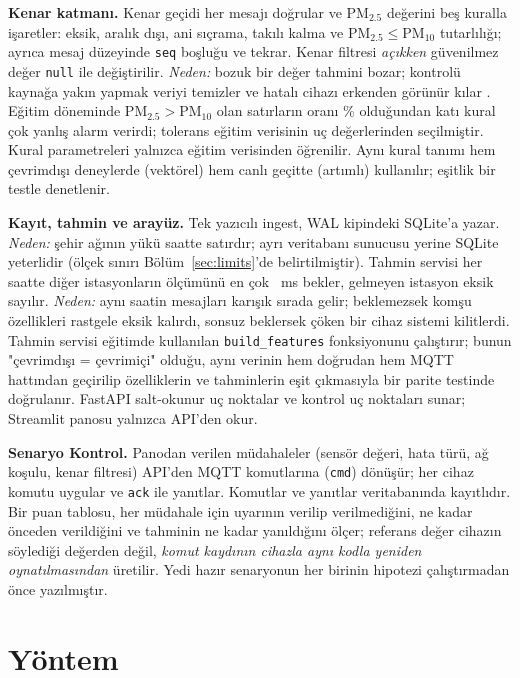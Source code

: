 \documentclass[conference]{IEEEtran}
\newcommand{\pmtwo}{PM$_{2.5}$}
\begin{document}
\textbf{Kenar katmanı.} Kenar geçidi her mesajı doğrular ve \pmtwo{} değerini beş kuralla işaretler: eksik, aralık dışı, ani sıçrama, takılı kalma ve \pmtwo{}$\le$PM$_{10}$ tutarlılığı; ayrıca mesaj düzeyinde \texttt{seq} boşluğu ve tekrar. Kenar filtresi \emph{açıkken} güvenilmez değer \texttt{null} ile değiştirilir. \emph{Neden:} bozuk bir değer tahmini bozar; kontrolü kaynağa yakın yapmak veriyi temizler ve hatalı cihazı erkenden görünür kılar \cite{R5,R21,R22}. Eğitim döneminde \pmtwo{}$>$PM$_{10}$ olan satırların oranı \%\nPmInconsistentTrainPct{} olduğundan katı kural çok yanlış alarm verirdi; tolerans eğitim verisinin uç değerlerinden seçilmiştir. Kural parametreleri yalnızca eğitim verisinden öğrenilir. Aynı kural tanımı hem çevrimdışı deneylerde (vektörel) hem canlı geçitte (artımlı) kullanılır; eşitlik bir testle denetlenir.

\textbf{Kayıt, tahmin ve arayüz.} Tek yazıcılı ingest, WAL kipindeki SQLite'a yazar. \emph{Neden:} şehir ağının yükü saatte \nDataStations{} satırdır; ayrı veritabanı sunucusu yerine SQLite yeterlidir (ölçek sınırı Bölüm~\ref{sec:limits}'de belirtilmiştir). Tahmin servisi her saatte diğer istasyonların ölçümünü en çok \nWaitMs{}~ms bekler, gelmeyen istasyon eksik sayılır. \emph{Neden:} aynı saatin mesajları karışık sırada gelir; beklemezsek komşu özellikleri rastgele eksik kalırdı, sonsuz beklersek çöken bir cihaz sistemi kilitlerdi. Tahmin servisi eğitimde kullanılan \texttt{build\_features} fonksiyonunu çalıştırır; bunun "çevrimdışı = çevrimiçi" olduğu, aynı verinin hem doğrudan hem MQTT hattından geçirilip özelliklerin ve tahminlerin eşit çıkmasıyla bir parite testinde doğrulanır. FastAPI salt-okunur uç noktalar ve kontrol uç noktaları sunar; Streamlit panosu yalnızca API'den okur.

\textbf{Senaryo Kontrol.} Panodan verilen müdahaleler (sensör değeri, hata türü, ağ koşulu, kenar filtresi) API'den MQTT komutlarına (\texttt{cmd}) dönüşür; her cihaz komutu uygular ve \texttt{ack} ile yanıtlar. Komutlar ve yanıtlar veritabanında kayıtlıdır. Bir puan tablosu, her müdahale için uyarının verilip verilmediğini, ne kadar önceden verildiğini ve tahminin ne kadar yanıldığını ölçer; referans değer cihazın söylediği değerden değil, \emph{komut kaydının cihazla aynı kodla yeniden oynatılmasından} üretilir. Yedi hazır senaryonun her birinin hipotezi çalıştırmadan önce yazılmıştır.

\section{Yöntem}
\end{document}
